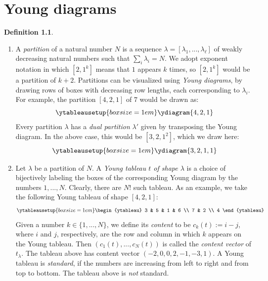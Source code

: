 \documentclass[11pt]{report}
\theoremstyle{definition}
\newtheorem{definition}[theorem]{Definition}
\theoremstyle{remark}
\theoremstyle{remark}
\begin{document}


\appendix \label{appendix}

\chapter{Young diagrams} \label{appendix:youngdiagrams}

\begin{definition}
\begin{enumerate}[label=(\roman*)]
\item A \emph{partition} of a natural number $N$ is a sequence $\lambda = [\lambda_1,...,\lambda_\ell]$ of weakly decreasing natural numbers such that $\sum_i \lambda_i = N$. We adopt exponent notation in which $[2,1^k]$ means that $1$ appears $k$ times, so $[2,1^k]$ would be a partition of $k+2$. Partitions can be visualized using \emph{Young diagrams}, by drawing rows of boxes with decreasing row lengths, each corresponding to $\lambda_i$. For example, the partition $[4,2,1]$ of $7$ would be drawn as:
\begin{equation*}
\ytableausetup{boxsize=1em}
\ydiagram{4,2,1}
\end{equation*}
Every partition $\lambda$ has a \emph{dual partition} $\lambda'$ given by transposing the Young diagram. In the above case, this would be $[3,2,1^2]$, which we draw here:
\begin{equation*}
\ytableausetup{boxsize=1em}
\ydiagram{3,2,1,1}
\end{equation*}
\item Let $\lambda$ be a partition of $N$. A \emph{Young tableau $t$ of shape $\lambda$} is a choice of bijectively labeling the boxes of the corresponding Young diagram by the numbers $1,...,N$. Clearly, there are $N!$ such tableau. As an example, we take the following Young tableau of shape $[4,2,1]$:
\begin{equation*}
\ytableausetup{boxsize=1em}
\begin{ytableau}
3 & 5 & 1 & 6 \\
7 & 2 \\
4
\end{ytableau}
\end{equation*}
Given a number $k \in \{ 1,...,N \}$, we define its \emph{content} to be $c_k(t) := i - j$, where $i$ and $j$, respectively, are the row and column in which $k$ appears on the Young tableau. Then $(c_1(t),...,c_N(t))$ is called the \emph{content vector} of $t_\lambda$. The tableau above has content vector $(-2,0,0,2,-1,-3,1)$. A Young tableau is \emph{standard}, if the numbers are increasing from left to right and from top to bottom. The tableau above is \emph{not} standard.

\end{enumerate}
\end{definition}
\end{document}
